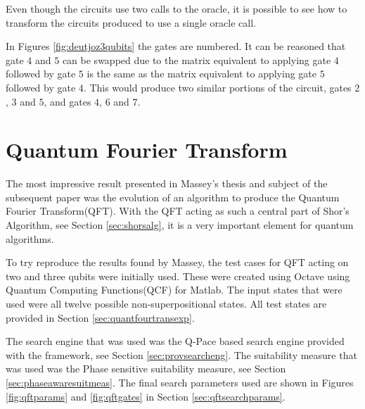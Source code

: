 Even though the circuits use two calls to the oracle, it is possible to see how to transform the circuits produced to use a single oracle call.

In Figures \ref{fig:deutjoz3qubits} the gates are numbered.
It can be reasoned that gate $4$ and $5$ can be swapped due to the matrix equivalent to applying gate $4$ followed by gate $5$ is the same as the matrix equivalent to applying gate $5$ followed by gate $4$.
This would produce two similar portions of the circuit, gates $2$, $3$ and $5$, and gates $4$, $6$ and $7$.


\section{Quantum Fourier Transform}

The most impressive result presented in Massey's thesis\cite{masseythesis} and subject of the subsequent paper\cite{Massey:2005:EHQ:1068009.1068288} was the evolution of an algorithm to produce the Quantum Fourier Transform(QFT).
With the QFT acting as such a central part of Shor's Algorithm, see Section \ref{sec:shorsalg}, it is a very important element for quantum algorithms.

To try reproduce the results found by Massey, the test cases for QFT acting on two and three qubits were initially used.
These were created using Octave\cite{octweb} using Quantum Computing Functions(QCF) for Matlab\cite{qcfweb}.
The input states that were used were all twelve possible non-superpositional states.
All test states are provided in Section \ref{sec:quantfourtransexp}.


The search engine that was used was the Q-Pace based search engine provided with the framework, see Section \ref{sec:provsearcheng}.
The suitability measure that was used was the Phase sensitive suitability measure, see Section \ref{sec:phaseawaresuitmeas}.
The final search parameters used are shown in Figures \ref{fig:qftparams} and \ref{fig:qftgates} in Section \ref{sec:qftsearchparams}.

